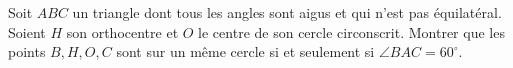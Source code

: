 Soit $ABC$ un triangle dont tous les angles sont aigus et qui n'est pas
équilatéral. Soient $H$ son orthocentre et $O$ le centre de son cercle
circonscrit. Montrer que les points $B, H, O, C$ sont sur un même cercle si
et seulement si $\angle BAC = 60^\circ$.
